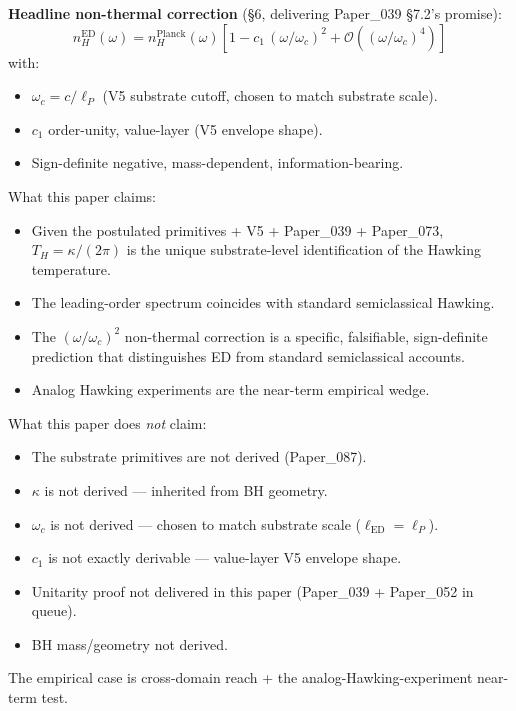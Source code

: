 \documentclass[11pt,a4paper]{article}
\begin{document}
\textbf{Headline non-thermal correction} (\S6, delivering Paper\_039 \S7.2's promise):
\[
n_H^\mathrm{ED}(\omega) = n_H^\mathrm{Planck}(\omega)[1 - c_1\,(\omega/\omega_c)^2 + \mathcal{O}((\omega/\omega_c)^4)]
\]
with:

\begin{itemize}[noitemsep]
\item $\omega_c = c/\ell_P$ (V5 substrate cutoff, chosen to match substrate scale).
\item $c_1$ order-unity, value-layer (V5 envelope shape).
\item Sign-definite negative, mass-dependent, information-bearing.
\end{itemize}

What this paper claims:

\begin{itemize}[noitemsep]
\item Given the postulated primitives + V5 + Paper\_039 + Paper\_073, $T_H = \kappa/(2\pi)$ is the unique substrate-level identification of the Hawking temperature.
\item The leading-order spectrum coincides with standard semiclassical Hawking.
\item The $(\omega/\omega_c)^2$ non-thermal correction is a specific, falsifiable, sign-definite prediction that distinguishes ED from standard semiclassical accounts.
\item Analog Hawking experiments are the near-term empirical wedge.
\end{itemize}

What this paper does \emph{not} claim:

\begin{itemize}[noitemsep]
\item The substrate primitives are not derived (Paper\_087).
\item $\kappa$ is not derived --- inherited from BH geometry.
\item $\omega_c$ is not derived --- chosen to match substrate scale ($\ell_\mathrm{ED} = \ell_P$).
\item $c_1$ is not exactly derivable --- value-layer V5 envelope shape.
\item Unitarity proof not delivered in this paper (Paper\_039 + Paper\_052 in queue).
\item BH mass/geometry not derived.
\end{itemize}

The empirical case is cross-domain reach + the analog-Hawking-experiment near-term test.
\end{document}
